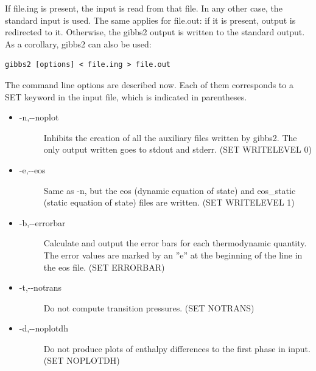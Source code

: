 \documentclass[a4paper]{article}
\begin{document}
If file.ing is present, the input is read from that file. In any other
case, the standard input is used. The same applies for file.out: if it
is present, output is redirected to it. Otherwise, the gibbs2 output
is written to the standard output. As a corollary, gibbs2 can also be
used:
%
\asciilist
\begin{lstlisting}
gibbs2 [options] < file.ing > file.out
\end{lstlisting}

The command line options are described now. Each of them corresponds
to a SET keyword in the input file, which is indicated in
parentheses.
%
\begin{itemize}

\item %
\begin{description}
\item[{-n,-{}-noplot}] \leavevmode 
Inhibits the creation of all the auxiliary files written by
gibbs2. The only output written goes to stdout and stderr.
(SET WRITELEVEL 0)

\end{description}

\item %
\begin{description}
\item[{-e,-{}-eos}] \leavevmode 
Same as -n, but the eos (dynamic equation of state) and
eos\_static (static equation of state) files are written.
(SET WRITELEVEL 1)

\end{description}

\item %
\begin{description}
\item[{-b,-{}-errorbar}] \leavevmode 
Calculate and output the error bars for each thermodynamic quantity.
The error values are marked by an ''e'' at the beginning of the line in
the eos file.
(SET ERRORBAR)

\end{description}

\item %
\begin{description}
\item[{-t,-{}-notrans}] \leavevmode 
Do not compute transition pressures.
(SET NOTRANS)

\end{description}

\item %
\begin{description}
\item[{-d,-{}-noplotdh}] \leavevmode 
Do not produce plots of enthalpy differences to the first phase in input.
(SET NOPLOTDH)


\end{description}
\end{itemize}
\end{document}
